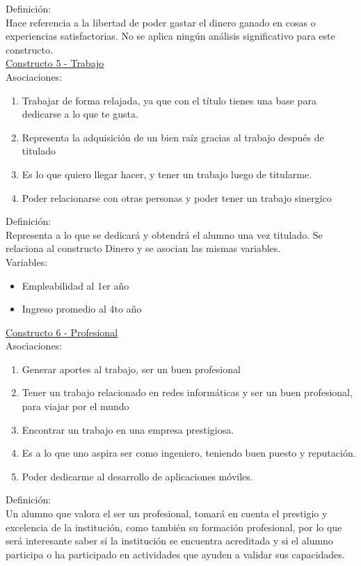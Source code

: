 Definición:\\
Hace referencia a la libertad de poder gastar el dinero ganado en cosas o experiencias satisfactorias. No se aplica ningún análisis significativo para este constructo.\\

\underline {Constructo 5 - Trabajo} \\
Asociaciones:
\begin{enumerate}
	\item Trabajar de forma relajada, ya que con el título tienes una base para dedicarse a lo que te gusta.
	\item Representa la adquisición de un bien raíz gracias al trabajo después de titulado
	\item Es lo que quiero llegar hacer, y tener un trabajo luego de titularme.	
	\item Poder relacionarse con otras personas y poder tener un trabajo sinergico
\end{enumerate}

Definición:\\
Representa a lo que se dedicará y obtendrá el alumno una vez titulado. Se relaciona al constructo Dinero y se asocian las mismas variables.\\

Variables:\\
\begin{itemize}
	\item Empleabilidad al 1er año
	\item Ingreso promedio al 4to año	
\end{itemize} 


\underline {Constructo 6 - Profesional} \\
Asociaciones:
\begin{enumerate}
	\item Generar aportes al trabajo, ser un buen profesional
	\item Tener un trabajo relacionado en redes informáticas y ser un buen profesional, para viajar por el mundo
	\item Encontrar un trabajo en una empresa prestigiosa.	
	\item Es a lo que uno aspira ser como ingeniero, teniendo buen puesto y reputación.
	\item Poder dedicarme al desarrollo de aplicaciones móviles.
\end{enumerate}

Definición:\\
Un alumno que valora el ser un profesional, tomará en cuenta el prestigio y excelencia de la institución, como también su formación profesional, por lo que será interesante saber si la institución se encuentra acreditada y si el alumno participa o ha participado en actividades que ayuden a validar sus capacidades.\\

